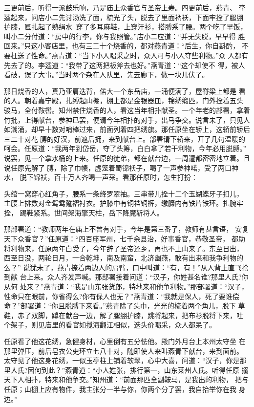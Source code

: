 三更前后，听得一派鼓乐响，乃是庙上众香官与圣帝上寿。四更前后，燕青、
李逵起来，问店小二先讨汤洗了面，梳光了头，脱去了里面衲袄，下面牢拴了腿绷
护膝，匾扎起了熟绢水，穿了多耳麻鞋，上穿汗衫，搭膊系了腰。两个吃了早饭，
叫小二分付道：“房中的行李，你与我照管。”店小二应道：“并无失脱，早早得
胜回来。”只这小客店里，也有三二十个烧香的，都对燕青道：“后生，你自斟酌，
不要枉送了性命。”燕青道：“当下小人喝采之时，众人可与小人夺些利物。”众
人都有先去了的。李逵道：“我带了这两把板斧去也好。”燕青道：“这个却使不
得，被人看破，误了大事。”当时两个杂在人队里，先去廊下，做一块儿伏了。

那日烧香的人，真乃亚肩迭背，偌大一个东岳庙，一涌便满了，屋脊梁上都是
看的人。朝着嘉宁殿，扎缚起山棚，棚上都是金银器皿，锦绣缎匹，门外拴着五头
骏马，全付鞍辔。知州禁住烧香的人，看这当年相扑献圣。一个年老的部署，拿着
竹批，上得献台，参神已罢，便请今年相扑的对手，出马争交。说言未了，只见人
如潮涌，却早十数对哨棒过来，前面列着四把绣旗。那任原坐在轿上，这轿前轿后
三二十对花膊的好汉，前遮后拥，来到献台上。部署请下轿来，开了几句温暖的
呵会。任原道：“我两年到岱岳，夺了头筹，白白拿了若干利物，今年必用脱膊。”
说罢，见一个拿水桶的上来。任原的徒弟，都在献台边，一周遭都密密地立着。且
说任原先解了膊，除了巾帻，虚笼着蜀锦袄子，喝了一声参神喏，受了两口神水，
脱下锦袄，百十万人齐喝一声采。看那任原时，怎生打扮：

头绾一窝穿心红角子，腰系一条绛罗翠袖。三串带儿拴十二个玉蝴蝶牙子扣儿，
主腰上排数对金鸳鸯踅褶衬衣。护膝中有铜裆铜裤，缴臁内有铁片铁环。扎腕牢拴，
踢鞋紧系。世间架海擎天柱，岳下降魔斩将人。

那部署道：“教师两年在庙上不曾有对手，今年是第三番了，教师有甚言语，
安复天下众香官？”任原道：“四百座军州，七千余县治，好事香官，恭敬圣帝，
都助将利物来，任原两年白受了，今年辞了圣帝还乡，再也不上山来了。东至日出，
西至日没，两轮日月，一合乾坤，南及南蛮，北济幽燕，敢有出来和我争利物的么？”
说犹未了，燕青捺着两边人的肩臂，口中叫道：“有，有！”从人背上直飞抢到献
台上来。众人齐发声喊。那部署接着问道：“汉子，你姓甚名谁?那里人氏?你从何
处来？”燕青道：“我是山东张货郎，特地来和他争利物。”那部署道：“汉子，
性命只在眼前，你省得么?你有保人也无？”燕青道：“我就是保人，死了要谁偿
命？”部署道：“你且脱膊下来看。”燕青除了头巾，光光的梳着两个角儿，脱下
草鞋，赤了双脚，蹲在献台一边，解了腿绷护膝，跳将起来，把布衫脱将下来，吐
个架子，则见庙里的看官如搅海翻江相似，迭头价喝采，众人都呆了。

任原看了他这花绣，急健身材，心里倒有五分怯他。殿门外月台上本州太守坐
在那里弹压，前后皂衣公吏环立七八十对，随即使人来叫燕青下献台，来到面前。
太守见了他这身花绣，一似玉亭柱上铺着软翠，心中大喜，问道：“汉子，你是那
里人氏?因何到此？”燕青道：“小人姓张，排行第一，山东莱州人氏。听得任原
搦天下人相扑，特来和他争交。”知州道：“前面那匹全副鞍马，是我出的利物，
把与任原；山棚上应有物件，我主张分一半与你，你两个分了罢，我自抬举你在我
身边。”

